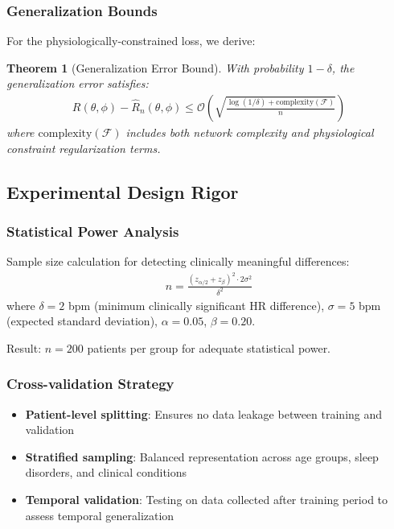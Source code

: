 \documentclass[11pt]{article}
\newtheorem{theorem}{Theorem}
\begin{document}
\subsubsection{Generalization Bounds}
For the physiologically-constrained loss, we derive:
\begin{theorem}[Generalization Error Bound]
With probability $1-\delta$, the generalization error satisfies:
\begin{align}
R(\theta, \phi) - \hat{R}_n(\theta, \phi) \leq \mathcal{O}\left(\sqrt{\frac{\log(1/\delta) + \text{complexity}(\mathcal{F})}{n}}\right)
\end{align}
where $\text{complexity}(\mathcal{F})$ includes both network complexity and physiological constraint regularization terms.
\end{theorem}

\subsection{Experimental Design Rigor}

\subsubsection{Statistical Power Analysis}
Sample size calculation for detecting clinically meaningful differences:
\begin{align}
n = \frac{(z_{\alpha/2} + z_\beta)^2 \cdot 2\sigma^2}{\delta^2}
\end{align}
where $\delta = 2$ bpm (minimum clinically significant HR difference), $\sigma = 5$ bpm (expected standard deviation), $\alpha = 0.05$, $\beta = 0.20$.

Result: $n = 200$ patients per group for adequate statistical power.

\subsubsection{Cross-validation Strategy}
\begin{itemize}
    \item \textbf{Patient-level splitting}: Ensures no data leakage between training and validation
    \item \textbf{Stratified sampling}: Balanced representation across age groups, sleep disorders, and clinical conditions
    \item \textbf{Temporal validation}: Testing on data collected after training period to assess temporal generalization
\end{itemize}
\end{document}
